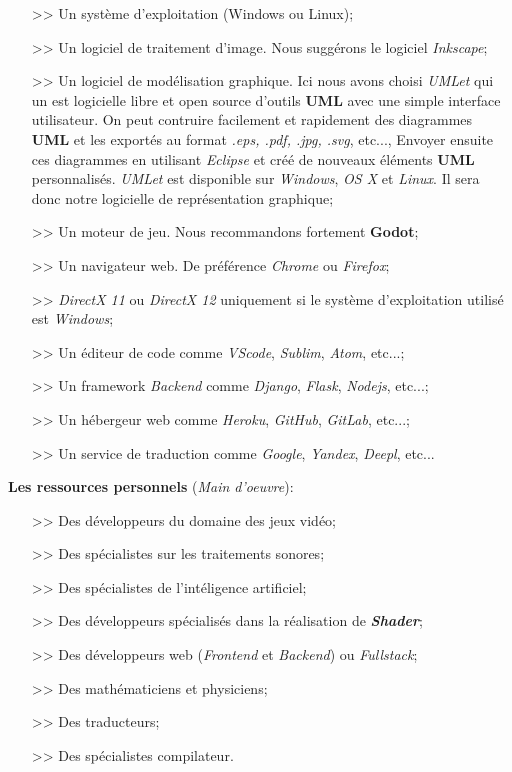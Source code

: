 \documentclass[ebook, 8pt, oneside, openany]{memoir}
\begin{document}
	\begin{itemize}
		\item[>>] Un système d'exploitation (Windows ou Linux);
		\item[>>] Un logiciel de traitement d'image. Nous suggérons le logiciel \textit{Inkscape};
		\item[>>] Un logiciel de modélisation graphique. Ici nous avons choisi \textit{UMLet} qui un est
		logicielle libre et open source d'outils \textbf{UML} avec une simple interface utilisateur.
		On peut contruire facilement et rapidement des diagrammes \textbf{UML} et les exportés au format
		\textit{.eps, .pdf, .jpg, .svg}, etc..., Envoyer ensuite ces diagrammes en utilisant
  		\textit{Eclipse} et créé de nouveaux éléments \textbf{UML} personnalisés. \textit{UMLet} est
  		disponible sur \emph{Windows}, \emph{OS X} et \emph{Linux}. Il sera donc notre logicielle de
  		représentation graphique;
  		\item[>>] Un moteur de jeu. Nous recommandons fortement \textbf{Godot};
  		\item[>>] Un navigateur web. De préférence \textit{Chrome} ou \textit{Firefox};
  		\item[>>] \emph{DirectX 11} ou \emph{DirectX 12} uniquement si le système d'exploitation utilisé est
  		\textit{Windows};
  		\item[>>] Un éditeur de code comme \textit{VScode}, \textit{Sublim}, \textit{Atom}, etc...;
  		\item[>>] Un framework \textit{Backend} comme \textit{Django}, \textit{Flask}, \textit{Nodejs},
  		etc...;
  		\item[>>] Un hébergeur web comme \textit{Heroku}, \textit{GitHub}, \textit{GitLab}, etc...;
  		\item[>>] Un service de traduction comme \textit{Google}, \textit{Yandex}, \textit{Deepl}, etc...
	\end{itemize}
	\textbf{Les ressources personnels} (\textit{Main d'oeuvre}):
	\begin{itemize}
		\item[>>] Des développeurs du domaine des jeux vidéo;
		\item[>>] Des spécialistes sur les traitements sonores;
		\item[>>] Des spécialistes de l'intéligence artificiel;
		\item[>>] Des développeurs spécialisés dans la réalisation de \textbf{\textit{Shader}};
		\item[>>] Des développeurs web (\textit{Frontend} et \textit{Backend}) ou \textit{Fullstack};
		\item[>>] Des mathématiciens et physiciens;
		\item[>>] Des traducteurs;
		\item[>>] Des spécialistes compilateur.
	\end{itemize}
\end{document}
